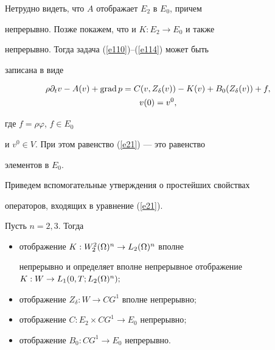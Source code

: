 Нетрудно видеть, что $A$ отображает $E_2$ в $E_0$, причем


непрерывно. Позже покажем, что и $K:E_2\to E_0$ и также


непрерывно. Тогда задача (\ref{e110})--(\ref{e114}) может быть


записана в виде


\begin{gather}


\label{e21} \rho \partial_t v-A(v)+\grad 


p=C(v,Z_{\delta}(v))- K(v)+B_0(Z_{\delta}(v))+f, \\


\label{e22} v(0)=v^0,


\end{gather}


где $f=\rho \varphi$, $f\in E_0$


и $v^0 \in V$. При этом равенство (\ref{e21}) --- это равенство


элементов в $E_0$.





Приведем вспомогательные утверждения о простейших свойствах


операторов, входящих в уравнение (\ref{e21}).





\begin{lems}\label{l21}


Пусть $n=2,3$. Тогда 


\begin{itemize}


\item[1)] отображение $K:W^2_2(\Omega)^n\to L_2(\Omega)^n$ вполне


непрерывно и определяет вполне непрерывное отображение $K:W\to


L_1(0,T;L_2(\Om)^n);$


\item[2)] отображение $Z_{\delta}:W\to CG^1$ вполне непрерывно$;$


\item[3)] отображение $C:E_2\times CG^1\to E_0$ непрерывно$;$


\item[4)] отображение $B_0:CG^1\to E_0$ непрерывно.


\end{itemize}


\end{lems}





